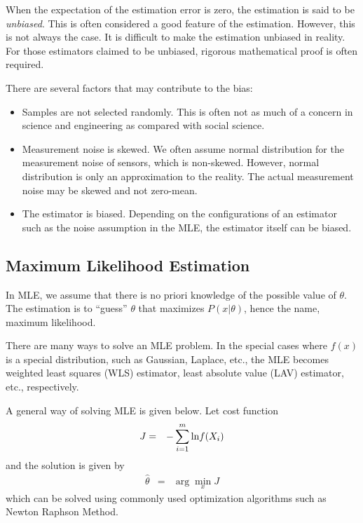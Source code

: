 When the expectation of the estimation error is zero, the estimation is said to be \textit{unbiased}. This is often considered a good feature of the estimation. However, this is not always the case. It is difficult to make the estimation unbiased in reality. For those estimators claimed to be unbiased, rigorous mathematical proof is often required.

There are several factors that may contribute to the bias:
\begin{itemize}
	\item Samples are not selected randomly. This is often not as much of a concern in science and engineering as compared with social science.
	\item Measurement noise is skewed. We often assume normal distribution for the measurement noise of sensors, which is non-skewed. However, normal distribution is only an approximation to the reality. The actual measurement noise may be skewed and not zero-mean.
	\item The estimator is biased. Depending on the configurations of an estimator such as the noise assumption in the MLE, the estimator itself can be biased.
\end{itemize}

\subsection{Maximum Likelihood Estimation}

In MLE, we assume that there is no priori knowledge of the possible value of $\theta$. The estimation is to ``guess'' $\theta$ that maximizes $P(x|\theta)$, hence the name, maximum likelihood.

There are many ways to solve an MLE problem. In the special cases where $f(x)$ is a special distribution, such as Gaussian, Laplace, etc., the MLE becomes weighted least squares (WLS) estimator, least absolute value (LAV) estimator, etc., respectively.

A general way of solving MLE is given below. Let cost function
\begin{eqnarray}
	J &=& -\sum_{i=1}^{m}\textup{ln}f(X_i) \label{eq:mlecostfunc}
\end{eqnarray}
and the solution is given by
\begin{eqnarray}
	\hat{\theta} &=& \arg\min_{x} J \nonumber
\end{eqnarray}
which can be solved using commonly used optimization algorithms such as Newton Raphson Method.

